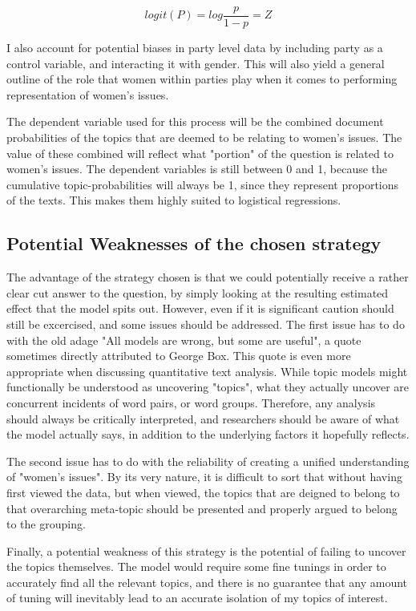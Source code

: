 \documentclass[12pt]{article}
\begin{document}
	\begin{equation}
		logit(P) = log \frac{p}{1-p} = Z
	\end{equation}
	
	I also account for potential biases in party level data by including party as a control variable, and interacting it with gender. This will also yield a general outline of the role that women within parties play when it comes to performing representation of women's issues. 
	
	The dependent variable used for this process will be the combined document probabilities of the topics that are deemed to be relating to women's issues. The value of these combined will reflect what "portion" of the question is related to women's issues. The dependent variables is still between 0 and 1, because the cumulative topic-probabilities will always be 1, since they represent proportions of the texts. This makes them highly suited to logistical regressions. 
	
	\subsection{Potential Weaknesses of the chosen strategy}
	
	The advantage of the strategy chosen is that we could potentially receive a rather clear cut answer to the question, by simply looking at the resulting estimated effect that the model spits out. However, even if it is significant caution should still be excercised, and some issues should be addressed. The first issue has to do with the old adage "All models are wrong, but some are useful", a quote sometimes directly attributed to George Box. This quote is even more appropriate when discussing quantitative text analysis. While topic models might functionally be understood as uncovering "topics", what they actually uncover are concurrent incidents of word pairs, or word groups. Therefore, any analysis should always be critically interpreted, and researchers should be aware of what the model actually says, in addition to the underlying factors it hopefully reflects.
	
	The second issue has to do with the reliability of creating a unified understanding of "women's issues". By its very nature, it is difficult to sort that without having first viewed the data, but when viewed, the topics that are deigned to belong to that overarching meta-topic should be presented and properly argued to belong to the grouping. 
	
	Finally, a potential weakness of this strategy is the potential of failing to uncover the topics themselves. The model would require some fine tunings in order to accurately find all the relevant topics, and there is no guarantee that any amount of tuning will inevitably lead to an accurate isolation of my topics of interest. 
	
\end{document}
